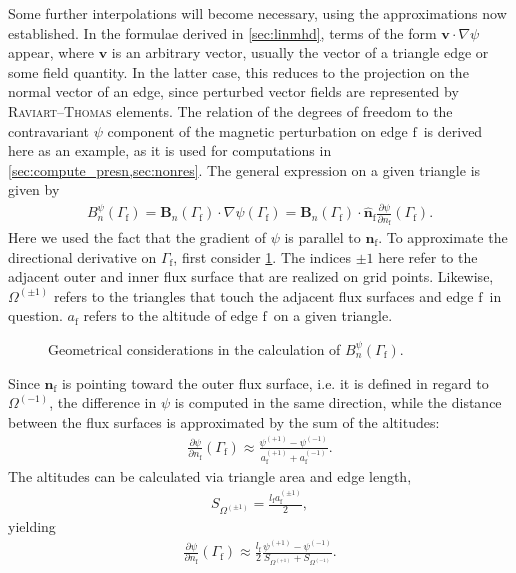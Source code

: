 \documentclass[a4paper, twoside, 10pt, english]{article}
\numberwithin{equation}{section}
\let\vec\symbf
\newcommand*\grad{\ensuremath{\nabla}}
\newcommand*\pd[2][]{\ensuremath{\frac{\partial #1}{\partial #2}}}  %
\newcommand*\fs{\ensuremath{\textrm{f}}}  %
\begin{document}
Some further interpolations will become necessary, using the approximations now established. In the formulae derived in \cref{sec:linmhd}, terms of the form $\vec{v} \cdot \grad \psi$ appear, where $\vec{v}$ is an arbitrary vector, usually the vector of a triangle edge or some field quantity. In the latter case, this reduces to the projection on the normal vector of an edge, since perturbed vector fields are represented by \textsc{Raviart}--\textsc{Thomas} elements. The relation of the degrees of freedom to the contravariant $\psi$ component of the magnetic perturbation on edge \fs\ is derived here as an example, as it is used for computations in \cref{sec:compute_presn,sec:nonres}. The general expression on a given triangle is given by
\begin{gather}
  B_{n}^{\psi} (\Gamma_{\fs}) = \vec{B}_{n} (\Gamma_{\fs}) \cdot \grad \psi (\Gamma_{\fs}) = \vec{B}_{n} (\Gamma_{\fs}) \cdot \hat{\vec{n}}_{\fs} \pd[\psi]{n_{\fs}} (\Gamma_{\fs}).
\end{gather}
Here we used the fact that the gradient of $\psi$ is parallel to $\vec{n}_{\fs}$. To approximate the directional derivative on $\Gamma_{\fs}$, first consider \cref{fig:altitudes}. The indices $\pm 1$ here refer to the adjacent outer and inner flux surface that are realized on grid points. Likewise, $\Omega^{(\pm 1)}$ refers to the triangles that touch the adjacent flux surfaces and edge \fs\ in question. $a_{\fs}$ refers to the altitude of edge \fs\ on a given triangle.
\begin{figure}[bth]
  \centering
  
  \caption{Geometrical considerations in the calculation of $B_{n}^{\psi} (\Gamma_{\fs})$.}
  \label{fig:altitudes}
\end{figure}
Since $\vec{n}_{\fs}$ is pointing toward the outer flux surface, i.e. it is defined in regard to $\Omega^{(-1)}$, the difference in $\psi$ is computed in the same direction, while the distance between the flux surfaces is approximated by the sum of the altitudes:
\begin{gather}
  \pd[\psi]{n_{\fs}} (\Gamma_{\fs}) \approx \frac{\psi^{(+1)} - \psi^{(-1)}}{a_{\fs}^{(+1)} + a_{\fs}^{(-1)}}.
\end{gather}
The altitudes can be calculated via triangle area and edge length,
\begin{gather}
  S_{\Omega^{(\pm 1)}} = \frac{l_{\fs} a_{\fs}^{(\pm 1)}}{2},
\end{gather}
yielding
\begin{gather}
  \pd[\psi]{n_{\fs}} (\Gamma_{\fs}) \approx \frac{l_{\fs}}{2} \frac{\psi^{(+1)} - \psi^{(-1)}}{S_{\Omega^{(+1)}} + S_{\Omega^{(-1)}}}.
\end{gather}
\end{document}
